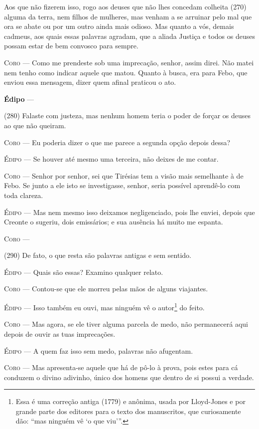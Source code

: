 Aos que não fizerem isso, rogo aos deuses que não lhes concedam colheita
(270) alguma da terra, nem filhos de mulheres, mas venham a se arruinar
pelo mal que ora se abate ou por um outro ainda mais odioso. Mas quanto
a vós, demais cadmeus, aos quais essas palavras agradam, que a aliada
Justiça e todos os deuses possam estar de bem convosco para sempre.

\textsc{Coro} --- Como me prendeste sob uma imprecação, senhor, assim direi. Não matei nem
tenho como indicar aquele que matou. Quanto à busca, era para Febo, que
enviou essa mensagem, dizer quem afinal praticou o ato.

\textbf{Édipo} ---

(280) Falaste com justeza, mas nenhum homem teria o poder de forçar os
deuses ao que não queiram.

\textsc{Coro} --- Eu poderia dizer o que me parece a segunda opção depois dessa?

\textsc{Édipo} --- Se houver até mesmo uma terceira, não deixes de me contar.

\textsc{Coro} --- Senhor por senhor, sei que Tirésias tem a visão mais semelhante à de
Febo. Se junto a ele isto se investigasse, senhor, seria possível
aprendê-lo com toda clareza.

\textsc{Édipo} --- Mas nem mesmo isso deixamos negligenciado, pois lhe enviei, depois que
Creonte o sugeriu, dois emissários; e sua ausência há muito me espanta.

\textsc{Coro} ---

(290) De fato, o que resta são palavras antigas e sem sentido.

\textsc{Édipo} --- Quais são essas? Examino qualquer relato.

\textsc{Coro} --- Contou-se que ele morreu pelas mãos de alguns viajantes.

\textsc{Édipo} --- Isso também eu ouvi, mas ninguém vê o autor\footnote{Essa é uma correção
  antiga (1779) e anônima, usada por Lloyd-Jones e por grande parte dos
  editores para o texto dos manuscritos, que curiosamente dão: ``mas
  ninguém vê `o que viu'''.} do feito.

\textsc{Coro} --- Mas agora, se ele tiver alguma parcela de medo, não permanecerá aqui
depois de ouvir as tuas imprecações.

\textsc{Édipo} --- A quem faz isso sem medo, palavras não afugentam.

\textsc{Coro} --- Mas apresenta-se aquele que há de pô-lo à prova, pois estes para cá
conduzem o divino adivinho, único dos homens que dentro de si possui a
verdade.

